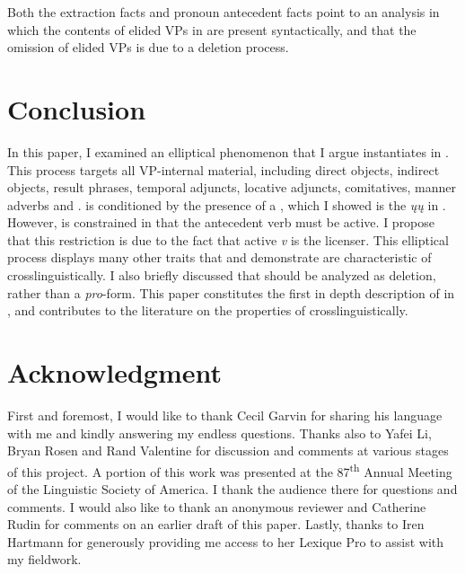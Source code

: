 \documentclass[output=paper]{LSP/langsci}
\begin{document}
{{Both the extraction facts and pronoun antecedent facts point to an analysis in which the contents of elided VPs in  are present syntactically, and that the omission of elided VPs is due to a deletion process.

\section{Conclusion}\label{sec:johnson:5}

In this paper, I examined an elliptical phenomenon that I argue instantiates  in . This process targets all VP-internal material, including direct objects, indirect objects, result phrases, temporal adjuncts, locative adjuncts, comitatives, manner adverbs and  .  is conditioned by the presence of a , which I showed is the  \emph{ųų} in . However,   is constrained in that the antecedent verb must be active. I propose that this restriction is due to the fact that active \emph{v} is the licenser. This elliptical process displays many other traits that \citet{Goldberg2005} and \citet{Fortin2007} demonstrate are characteristic of  crosslinguistically. I also briefly discussed that   should be analyzed as  deletion, rather than a  \emph{pro}-form. This paper constitutes the first in depth description of  in , and contributes to the literature on the properties of  crosslinguistically. 

\section*{Acknowledgment}

First and foremost, I would like to thank Cecil Garvin for sharing his language with me and kindly answering my endless questions. Thanks also to Yafei Li, Bryan Rosen and Rand Valentine for discussion and comments at various stages of this project. A portion of this work was presented at the 87\textsuperscript{th} Annual Meeting of the Linguistic Society of America. I thank the audience there for questions and comments. I would also like to thank an anonymous reviewer and Catherine Rudin for comments on an earlier draft of this paper. Lastly, thanks to Iren Hartmann for generously providing me access to her Lexique Pro   to assist with my fieldwork.

}}
\end{document}

